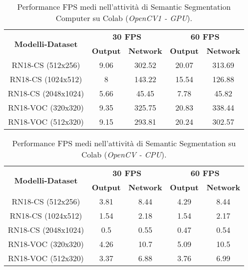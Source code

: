 \begin{table}
    \renewcommand{\baselinestretch}{1}
    \centering
    \begin{adjustbox}{max width=\textwidth}
    \begin{tabular}{|c||c|c||c|c||}
        \hline
        \multirow{2}{*}{\bfseries{\Large Modelli-Dataset}} & \multicolumn{2}{c||}{\bfseries{30 FPS}} & \multicolumn{2}{c||}{\bfseries{60 FPS}}\\            & \bfseries{Output} & \bfseries{Network} & \bfseries{Output} & \bfseries{Network}\\
        \hline
        \hline
        RN18-CS (512x256) & 9.06 & 302.52 & 20.07 & 313.69\\
        \hline
        RN18-CS (1024x512) & 8 & 143.22 & 15.54 & 126.88\\
        \hline 
        RN18-CS (2048x1024) & 5.66 & 45.45 & 7.78 & 45.82\\
        \hline
        RN18-VOC (320x320) & 9.35 & 325.75 & 20.83 & 338.44\\
        \hline
        RN18-VOC (512x320) & 9.15 & 293.81 & 20.24 & 302.57\\
        \hline
    \end{tabular}
    \end{adjustbox}
    \vspace{0.5cm}
    \caption{Performance FPS medi nell'attività di Semantic Segmentation Computer su Colab (\emph{OpenCV1 - GPU}).}
    \label{average performance Colab GPU sem_seg}
\end{table}

\begin{table}
    \centering
    \begin{adjustbox}{max width=\textwidth}
    \begin{tabular}{|c||c|c||c|c||}
        \hline
        \multirow{2}{*}{\bfseries{\Large Modelli-Dataset}} & \multicolumn{2}{c||}{\bfseries{30 FPS}} & \multicolumn{2}{c||}{\bfseries{60 FPS}}\\            & \bfseries{Output} & \bfseries{Network} & \bfseries{Output} & \bfseries{Network}\\
        \hline
        \hline
        RN18-CS (512x256) & 3.81 & 8.44 & 4.29 & 8.44\\
        \hline
        RN18-CS (1024x512) & 1.54 & 2.18 & 1.54 & 2.17\\
        \hline 
        RN18-CS (2048x1024) & 0.5 & 0.55 & 0.47 & 0.54\\
        \hline
        RN18-VOC (320x320) & 4.26 & 10.7 & 5.09 & 10.5\\
        \hline
        RN18-VOC (512x320) & 3.37 & 6.88 & 3.76 & 6.99\\
        \hline
    \end{tabular}
    \end{adjustbox}
    \vspace{0.5cm}
    \caption{Performance FPS medi nell'attività di Semantic Segmentation su Colab (\emph{OpenCV - CPU}).}
    \label{average performance Colab CPU sem_seg}
\end{table}

